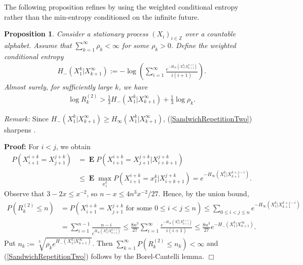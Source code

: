 \documentclass[a4paper,12pt]{article}
\newcommand{\okra}[1]{\left( #1 \right)}
\DeclareMathOperator{\mean}{\mathbf{E}}
\newtheorem{proposition}{Proposition}
\newenvironment*{proof}{\begin{trivlist}\item[]
\noindent\textbf{Proof:}}{$\Box$\par\end{trivlist}}
\begin{document}
The following proposition refines \cite[Theorem 9.25]{Debowski21} by
using the weighted conditional entropy rather than the min-entropy
conditioned on the infinite future.
\begin{proposition}
  \label{theoSandwichRepetitionTwo}
  Consider a stationary process $(X_i)_{i\in\mathbb{Z}}$ over a
  countable alphabet. Assume that $\sum_{k=1}^\infty \rho_k<\infty$
  for some $\rho_k>0$. Define the weighted conditional entropy
  \begin{align}
    H_-(X_1^k|X_{k+1}^\infty):=-\log \okra{
    \sum_{i=1}^\infty\frac{e^{-H_\infty(X_1^k|X_{k+1}^{k+i})}}{i(i+1)}}.
  \end{align}
  Almost surely, for sufficiently large $k$, we have
  \begin{align}
    \label{SandwichRepetitionTwo}
    \log R^{(2)}_k> \frac{1}{3}H_-(X_1^k|X_{k+1}^\infty)
    +\frac{1}{3}\log\rho_k
    .
  \end{align}
\end{proposition}
\noindent
\emph{Remark:} Since
$H_-(X_1^k|X_{k+1}^\infty)\ge H_\infty(X_1^k|X_{k+1}^\infty)$,
(\ref{SandwichRepetitionTwo}) sharpens \cite[Theorem
9.25]{Debowski21}.
\begin{proof}
  For $i<j$, we obtain 
\begin{align}
  P(X_{i+1}^{i+k}=X_{j+1}^{j+k})
  &=
    \mean
    P(X_{i+1}^{i+k}=X_{j+1}^{j+k}|X_{i+k+1}^{j+k})
    \nonumber\\
  &\le
    \mean \max_{x_1^k} P(X_{i+1}^{i+k}=x_1^k|X_{i+k+1}^{j+k})
    =
    e^{-H_\infty(X_1^k|X_{k+1}^{k+j-i})}
    .
\end{align}
Observe that $3-2x\le x^{-2}$, so $n-x\le 4n^3x^{-2}/27$.
Hence, by the union bound,
\begin{align}
  P(R^{(2)}_k\le n)
  &= P\okra{X_{i+1}^{i+k}=X_{j+1}^{j+k} \text{ for some }
    0\le i<j\le n}
    \le \sum_{0\le i<j\le n}  e^{-H_\infty(X_1^k|X_{k+1}^{k+j-i})}
    \nonumber\\
  &= \sum_{i=1}^{n-1}
    \frac{n-i}{e^{H_\infty(X_1^k|X_{k+1}^{k+i})}}
    \le \frac{8n^3}{27}
    \sum_{i=1}^\infty\frac{e^{-H_\infty(X_1^k|X_{k+1}^{k+i})}}{i(i+1)}
    \le \frac{8n^3}{27} e^{-H_-(X_1^k|X_{k+1}^\infty)}.
\end{align}
Put $n_k:=\sqrt[3]{\rho_k e^{H_-(X_1^k|X_{k+1}^\infty)}}$. Then
$\sum_{k=1}^\infty P(R^{(2)}_k\le n_k)<\infty$ and
(\ref{SandwichRepetitionTwo}) follows by the Borel-Cantelli lemma.
\end{proof}
\end{document}
